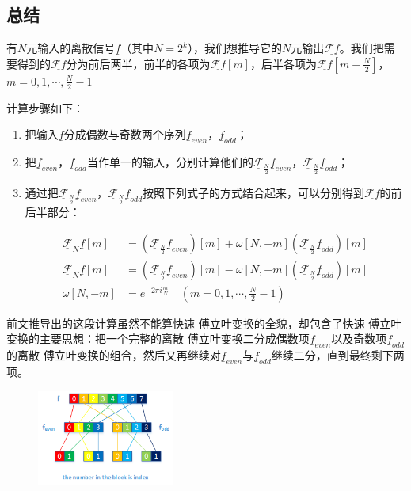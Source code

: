 \subsection{总结}
有$N$元输入的离散信号$\underline{f}$（其中$N=2^k$），我们想推导它的$N$元输出$\underline{\mathcal{F}f}$。我们把需要得到的$\underline{\mathcal{F}f}$分为前后两半，前半的各项为$\underline{\mathcal{F}f}[m]$，后半各项为$\underline{\mathcal{F}f}[m+\frac{N}{2}]$，$m=0,1,\cdots,\frac{N}{2}-1$

计算步骤如下：
\begin{enumerate}
	\item 把输入$\underline{f}$分成偶数与奇数两个序列$\underline{f}_{even}$，$\underline{f}_{odd}$；
	\item 把$\underline{f}_{even}$，$\underline{f}_{odd}$当作单一的输入，分别计算他们的$\underline{\mathcal{F}}_{\frac{N}{2}}\underline{f}_{even}$，$\underline{\mathcal{F}}_{\frac{N}{2}}\underline{f}_{odd}$；
	\item 通过把$\underline{\mathcal{F}}_{\frac{N}{2}}\underline{f}_{even}$，$\underline{\mathcal{F}}_{\frac{N}{2}}\underline{f}_{odd}$按照下列式子的方式结合起来，可以分别得到$\underline{\mathcal{F}f}$的前后半部分：

	      \begin{align*}
		      \underline{\mathcal{F}}_N\underline{f}[m] & = \left( \underline{\mathcal{F}}_{\frac{N}{2}}\underline{f}_{even} \right)[m]+\omega[N,-m]\left( \underline{\mathcal{F}}_{\frac{N}{2}}\underline{f}_{odd} \right)[m] \\
		      \underline{\mathcal{F}}_N\underline{f}[m] & = \left( \underline{\mathcal{F}}_{\frac{N}{2}}\underline{f}_{even} \right)[m]-\omega[N,-m]\left( \underline{\mathcal{F}}_{\frac{N}{2}}\underline{f}_{odd} \right)[m] \\
		      \omega[N,-m]                              & = e^{-2\pi i\frac{m}{N}}\quad (m=0,1,\cdots,\frac{N}{2}-1)
	      \end{align*}
\end{enumerate}


前文推导出的这段计算虽然不能算快速 傅立叶变换的全貌，却包含了快速 傅立叶变换的主要思想：把一个完整的离散 傅立叶变换二分成偶数项$\underline{f}_{even}$以及奇数项$\underline{f}_{odd}$的离散 傅立叶变换的组合，然后又再继续对$\underline{f}_{even}$与$\underline{f}_{odd}$继续二分，直到最终剩下两项。
\begin{figure}[H]
	\centering
	\includegraphics[width=0.4\textwidth]{assets/FFT.png}
\end{figure}
